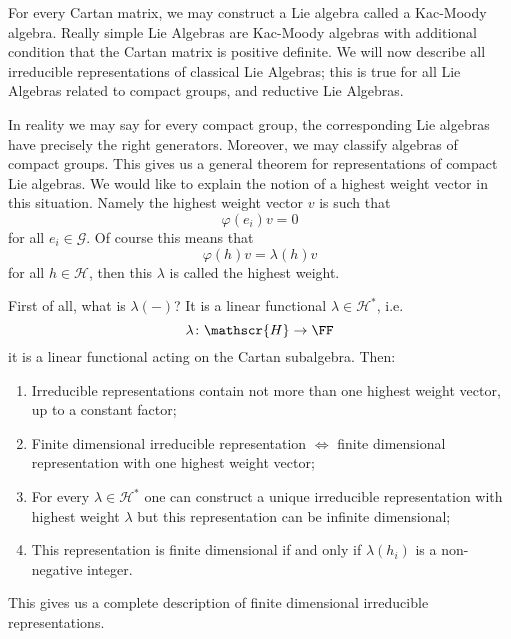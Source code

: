 For every Cartan matrix, we may construct a Lie algebra called a
Kac-Moody algebra. Really %
simple Lie Algebras are Kac-Moody algebras with additional
condition that the Cartan matrix is positive definite. We will
now describe all irreducible representations of classical Lie
Algebras; this is true for all Lie Algebras related to compact
groups, and reductive Lie Algebras.

In reality we may say for every compact group, the corresponding
Lie algebras have precisely the right generators. Moreover, we
may classify algebras of compact groups. This gives us a general
theorem for representations of compact Lie algebras. We would
like to explain the notion of a highest weight vector in this
situation. Namely the highest weight vector $v$ is such that
\begin{equation}
\varphi(e_{i})v = 0
\end{equation}
for all $e_{i}\in\mathscr{G}$. Of course this means that
\begin{equation}
\varphi(h)v = \lambda(h)v
\end{equation}
for all $h\in\mathscr{H}$, then this $\lambda$ is called the
highest weight. 

First of all, what is $\lambda(-)$? It is a linear functional
$\lambda\in\mathscr{H}^{*}$, i.e.
\begin{equation}
\lambda\colon\mathscr{H}\to\FF
\end{equation}
it is a linear functional acting on the Cartan subalgebra. Then:
\begin{enumerate}
\item Irreducible representations contain not more than one
  highest weight vector, up to a constant factor; 
\item Finite dimensional irreducible representation $\iff$ finite
  dimensional representation with one highest weight vector;
\item For every $\lambda\in\mathscr{H}^{*}$ one can construct a
  unique irreducible representation with highest weight $\lambda$
  but this representation can be infinite dimensional;
\item\label{lec16:cartan:mostImportantPoint}
  This representation is finite dimensional if and only if
  $\lambda(h_{i})$ is a non-negative integer.
\end{enumerate}
This gives us a complete description of finite dimensional
irreducible representations.

